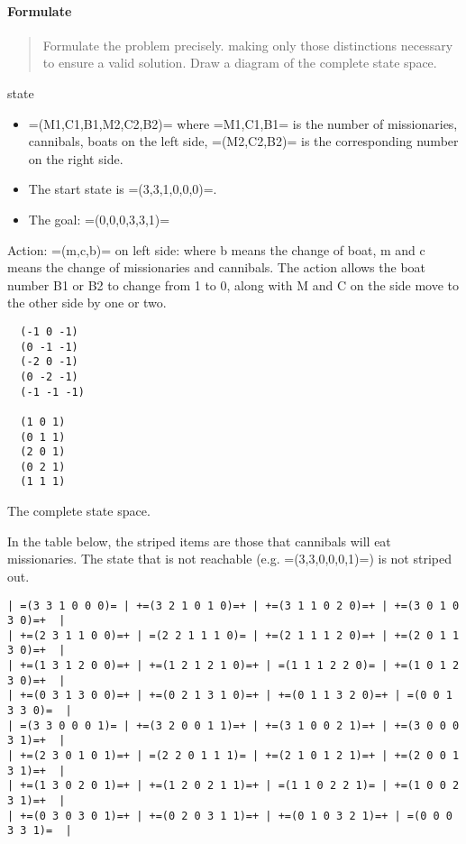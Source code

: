 \paragraph{Formulate}
\begin{quote}
  Formulate the problem precisely. making only those distinctions
  necessary to ensure a valid solution. Draw a diagram of the complete
  state space.
\end{quote}

state
\begin{itemize}
\item =(M1,C1,B1,M2,C2,B2)= where =M1,C1,B1= is the number of missionaries, cannibals, boats on the left side,
  =(M2,C2,B2)= is the corresponding number on the right side.
\item The start state is =(3,3,1,0,0,0)=.
\item The goal: =(0,0,0,3,3,1)=
\end{itemize}
Action: =(m,c,b)= on left side: where b means the change of boat, m
and c means the change of missionaries and cannibals.  The action
allows the boat number B1 or B2 to change from 1 to 0, along with M
and C on the side move to the other side by one or two.
     
\begin{lstlisting}
  (-1 0 -1)
  (0 -1 -1)
  (-2 0 -1)
  (0 -2 -1)
  (-1 -1 -1)

  (1 0 1)
  (0 1 1)
  (2 0 1)
  (0 2 1)
  (1 1 1)
\end{lstlisting}
The complete state space.

In the table below, the striped items are those that cannibals will
eat missionaries.  The state that is not reachable
(e.g. =(3,3,0,0,0,1)=) is not striped out.

\begin{lstlisting}
| =(3 3 1 0 0 0)= | +=(3 2 1 0 1 0)=+ | +=(3 1 1 0 2 0)=+ | +=(3 0 1 0 3 0)=+  |
| +=(2 3 1 1 0 0)=+ | =(2 2 1 1 1 0)= | +=(2 1 1 1 2 0)=+ | +=(2 0 1 1 3 0)=+  |
| +=(1 3 1 2 0 0)=+ | +=(1 2 1 2 1 0)=+ | =(1 1 1 2 2 0)= | +=(1 0 1 2 3 0)=+  |
| +=(0 3 1 3 0 0)=+ | +=(0 2 1 3 1 0)=+ | +=(0 1 1 3 2 0)=+ | =(0 0 1 3 3 0)=  |
| =(3 3 0 0 0 1)= | +=(3 2 0 0 1 1)=+ | +=(3 1 0 0 2 1)=+ | +=(3 0 0 0 3 1)=+  |
| +=(2 3 0 1 0 1)=+ | =(2 2 0 1 1 1)= | +=(2 1 0 1 2 1)=+ | +=(2 0 0 1 3 1)=+  |
| +=(1 3 0 2 0 1)=+ | +=(1 2 0 2 1 1)=+ | =(1 1 0 2 2 1)= | +=(1 0 0 2 3 1)=+  |
| +=(0 3 0 3 0 1)=+ | +=(0 2 0 3 1 1)=+ | +=(0 1 0 3 2 1)=+ | =(0 0 0 3 3 1)=  |
\end{lstlisting}

